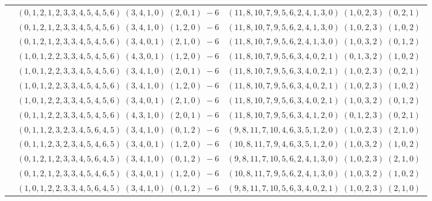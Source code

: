 \documentclass[11pt]{article}
\begin{document}
\begin{longtable}[l]{|c|c|c|}
 \cline{2-3} 
 & $(0 ,1 ,2 ,1 ,2 ,3 ,3 ,4 ,5 ,4 ,5 ,6) \;(3 ,4 ,1 ,0) \;(2 ,0 ,1) \;-6$ & $(11 ,8 ,10 ,7 ,9 ,5 ,6 ,2 ,4 ,1 ,3 ,0) \;(1 ,0 ,2 ,3) \;(0 ,2 ,1) \;$\\ 
 \cline{2-3} 
 & $(0 ,1 ,2 ,1 ,2 ,3 ,3 ,4 ,5 ,4 ,5 ,6) \;(3 ,4 ,1 ,0) \;(1 ,2 ,0) \;-6$ & $(11 ,8 ,10 ,7 ,9 ,5 ,6 ,2 ,4 ,1 ,3 ,0) \;(1 ,0 ,2 ,3) \;(1 ,0 ,2) \;$\\ 
 \cline{2-3} 
 & $(0 ,1 ,2 ,1 ,2 ,3 ,3 ,4 ,5 ,4 ,5 ,6) \;(3 ,4 ,0 ,1) \;(2 ,1 ,0) \;-6$ & $(11 ,8 ,10 ,7 ,9 ,5 ,6 ,2 ,4 ,1 ,3 ,0) \;(1 ,0 ,3 ,2) \;(0 ,1 ,2) \;$\\ 
 \cline{2-3} 
 & $(1 ,0 ,1 ,2 ,2 ,3 ,3 ,4 ,5 ,4 ,5 ,6) \;(4 ,3 ,0 ,1) \;(1 ,2 ,0) \;-6$ & $(11 ,8 ,10 ,7 ,9 ,5 ,6 ,3 ,4 ,0 ,2 ,1) \;(0 ,1 ,3 ,2) \;(1 ,0 ,2) \;$\\ 
 \cline{2-3} 
 & $(1 ,0 ,1 ,2 ,2 ,3 ,3 ,4 ,5 ,4 ,5 ,6) \;(3 ,4 ,1 ,0) \;(2 ,0 ,1) \;-6$ & $(11 ,8 ,10 ,7 ,9 ,5 ,6 ,3 ,4 ,0 ,2 ,1) \;(1 ,0 ,2 ,3) \;(0 ,2 ,1) \;$\\ 
 \cline{2-3} 
 & $(1 ,0 ,1 ,2 ,2 ,3 ,3 ,4 ,5 ,4 ,5 ,6) \;(3 ,4 ,1 ,0) \;(1 ,2 ,0) \;-6$ & $(11 ,8 ,10 ,7 ,9 ,5 ,6 ,3 ,4 ,0 ,2 ,1) \;(1 ,0 ,2 ,3) \;(1 ,0 ,2) \;$\\ 
 \cline{2-3} 
 & $(1 ,0 ,1 ,2 ,2 ,3 ,3 ,4 ,5 ,4 ,5 ,6) \;(3 ,4 ,0 ,1) \;(2 ,1 ,0) \;-6$ & $(11 ,8 ,10 ,7 ,9 ,5 ,6 ,3 ,4 ,0 ,2 ,1) \;(1 ,0 ,3 ,2) \;(0 ,1 ,2) \;$\\ 
 \cline{2-3} 
 & $(0 ,1 ,1 ,2 ,2 ,3 ,3 ,4 ,5 ,4 ,5 ,6) \;(4 ,3 ,1 ,0) \;(2 ,0 ,1) \;-6$ & $(11 ,8 ,10 ,7 ,9 ,5 ,6 ,3 ,4 ,1 ,2 ,0) \;(0 ,1 ,2 ,3) \;(0 ,2 ,1) \;$\\ 
 \cline{2-3} 
 & $(0 ,1 ,1 ,2 ,3 ,2 ,3 ,4 ,5 ,6 ,4 ,5) \;(3 ,4 ,1 ,0) \;(0 ,1 ,2) \;-6$ & $(9 ,8 ,11 ,7 ,10 ,4 ,6 ,3 ,5 ,1 ,2 ,0) \;(1 ,0 ,2 ,3) \;(2 ,1 ,0) \;$\\ 
 \cline{2-3} 
 & $(0 ,1 ,1 ,2 ,3 ,2 ,3 ,4 ,5 ,4 ,6 ,5) \;(3 ,4 ,0 ,1) \;(1 ,2 ,0) \;-6$ & $(10 ,8 ,11 ,7 ,9 ,4 ,6 ,3 ,5 ,1 ,2 ,0) \;(1 ,0 ,3 ,2) \;(1 ,0 ,2) \;$\\ 
 \cline{2-3} 
 & $(0 ,1 ,2 ,1 ,2 ,3 ,3 ,4 ,5 ,6 ,4 ,5) \;(3 ,4 ,1 ,0) \;(0 ,1 ,2) \;-6$ & $(9 ,8 ,11 ,7 ,10 ,5 ,6 ,2 ,4 ,1 ,3 ,0) \;(1 ,0 ,2 ,3) \;(2 ,1 ,0) \;$\\ 
 \cline{2-3} 
 & $(0 ,1 ,2 ,1 ,2 ,3 ,3 ,4 ,5 ,4 ,6 ,5) \;(3 ,4 ,0 ,1) \;(1 ,2 ,0) \;-6$ & $(10 ,8 ,11 ,7 ,9 ,5 ,6 ,2 ,4 ,1 ,3 ,0) \;(1 ,0 ,3 ,2) \;(1 ,0 ,2) \;$\\ 
 \cline{2-3} 
 & $(1 ,0 ,1 ,2 ,2 ,3 ,3 ,4 ,5 ,6 ,4 ,5) \;(3 ,4 ,1 ,0) \;(0 ,1 ,2) \;-6$ & $(9 ,8 ,11 ,7 ,10 ,5 ,6 ,3 ,4 ,0 ,2 ,1) \;(1 ,0 ,2 ,3) \;(2 ,1 ,0) \;$\\ 

\end{longtable}
\end{document}
